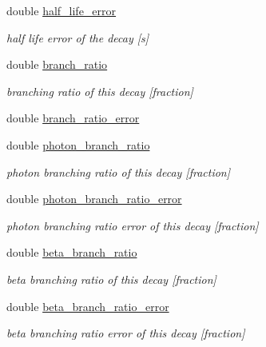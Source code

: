 \begin{DoxyCompactItemize}
\mbox{\label{structpyne_1_1decay_a86b701ada7ee8d4a8fec95aedd711a87}} 
double \hyperlink{structpyne_1_1decay_a86b701ada7ee8d4a8fec95aedd711a87}{half\+\_\+life\+\_\+error}
\begin{DoxyCompactList}\small\item\em half life error of the decay \mbox{[}s\mbox{]} \end{DoxyCompactList}\item 
\mbox{\label{structpyne_1_1decay_a21a58630e6aac8aa5517fb9d1bafe5d6}} 
double \hyperlink{structpyne_1_1decay_a21a58630e6aac8aa5517fb9d1bafe5d6}{branch\+\_\+ratio}
\begin{DoxyCompactList}\small\item\em branching ratio of this decay \mbox{[}fraction\mbox{]} \end{DoxyCompactList}\item 
double \hyperlink{structpyne_1_1decay_a6df2be5724d68bfe566b53fa71320812}{branch\+\_\+ratio\+\_\+error}
\item 
\mbox{\label{structpyne_1_1decay_a7edc52996ae0705ac8c35fb6c437c3a8}} 
double \hyperlink{structpyne_1_1decay_a7edc52996ae0705ac8c35fb6c437c3a8}{photon\+\_\+branch\+\_\+ratio}
\begin{DoxyCompactList}\small\item\em photon branching ratio of this decay \mbox{[}fraction\mbox{]} \end{DoxyCompactList}\item 
\mbox{\label{structpyne_1_1decay_a5492d786323042f5348897584065ec02}} 
double \hyperlink{structpyne_1_1decay_a5492d786323042f5348897584065ec02}{photon\+\_\+branch\+\_\+ratio\+\_\+error}
\begin{DoxyCompactList}\small\item\em photon branching ratio error of this decay \mbox{[}fraction\mbox{]} \end{DoxyCompactList}\item 
\mbox{\label{structpyne_1_1decay_a566b715c5e41239f2c178880ae3dc3c5}} 
double \hyperlink{structpyne_1_1decay_a566b715c5e41239f2c178880ae3dc3c5}{beta\+\_\+branch\+\_\+ratio}
\begin{DoxyCompactList}\small\item\em beta branching ratio of this decay \mbox{[}fraction\mbox{]} \end{DoxyCompactList}\item 
\mbox{\label{structpyne_1_1decay_afe2d8be6a39ee1dd7045a1970451f04e}} 
double \hyperlink{structpyne_1_1decay_afe2d8be6a39ee1dd7045a1970451f04e}{beta\+\_\+branch\+\_\+ratio\+\_\+error}
\begin{DoxyCompactList}\small\item\em beta branching ratio error of this decay \mbox{[}fraction\mbox{]} \end{DoxyCompactList}\end{DoxyCompactItemize}


